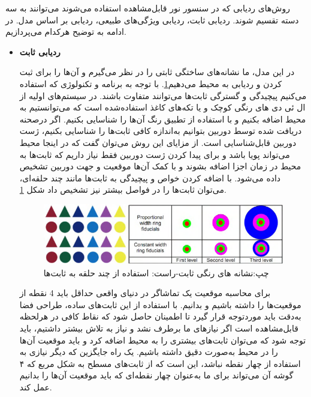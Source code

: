 روش‌های ردیابی که در سنسور نور قابل‌مشاهده استفاده می‌شوند می‌توانند به سه دسته تقسیم شوند. ردیابی ثابت، ردیابی ویژگی‌های طبیعی، ردیابی بر اساس مدل. در ادامه به توضیح هرکدام می‌پردازیم.
\begin{itemize}
	\item \textbf{ردیابی ثابت}
	
در این مدل، ما نشانه‌های ساختگی ثابتی را در نظر می‌گیرم و آن‌ها را  برای ثبت کردن و ردیابی به محیط می‌دهیم\ref{fig:fiducial}. با توجه به برنامه و تکنولوژی که استفاده می‌کنیم پیچیدگی و گسترگی ثابت‌ها می‌توانند متفاوت باشند. در سیستم‌های اولیه از ال ئی دی های رنگی کوچک و یا تکه‌های کاغذ استفاده‌شده است که می‌توانستیم به محیط اضافه بکنیم و با استفاده از تطبیق رنگ آن‌ها را شناسایی بکنیم. اگر درصحنه دریافت شده توسط دوربین بتوانیم به‌اندازه کافی ثابت‌ها را شناسایی بکنیم، ژست دوربین قابل‌شناسایی است. از مزایای این روش می‌توان گفت که در اینجا محیط می‌تواند پویا باشد و برای پیدا کردن ژست دوربین فقط نیاز داریم که ثابت‌ها به محیط در زمان اجزا اضافه بشوند و با کمک آن‌ها موقعیت و جهت دوربین تشخیص داده می‌شود. با اضافه کردن خواص و پیچیدگی به ثابت‌ها مانند چند حلقه‌ای، می‌توان ثابت‌ها را در فواصل بیشتر نیز تشخیص داد شکل \ref{fig:fiducial}\cite{cho1998multi}.
	
	\begin{figure}
		\centering
		\includegraphics[width=1\linewidth]{image/fiducial}
		\caption {چپ:نشانه های رنگی ثابت-راست: استفاده از چند حلقه به ثابت‌ها\cite{cho1998multi}}
		\label{fig:fiducial}
	\end{figure}
	برای محاسبه موقعیت یک تماشاگر در دنیای واقعی حداقل باید 4 نقطه از موقعیت‌ها را داشته باشیم و بدانیم. با استفاده از این ثابت‌های ساده، طراحی فضا به‌دقت باید موردتوجه قرار گیرد تا اطمینان حاصل شود که نقاط کافی در هرلحظه قابل‌مشاهده است اگر نیازهای ما برطرف نشد و نیاز به تلاش بیشتر داشتیم، باید توجه شود که می‌توان ثابت‌های بیشتری را به محیط اضافه کرد و باید موقعیت آن‌ها را در محیط به‌صورت دقیق داشته باشیم. یک راه جایگزین که دیگر نیازی به استفاده از چهار نقطه نباشد، این است که از ثابت‌های مسطح به شکل مربع که ۴ گوشه آن می‌تواند برای ما به‌عنوان چهار نقطه‌ای که باید موقعیت آن‌ها را بدانیم عمل کند.
	

\end{itemize}
